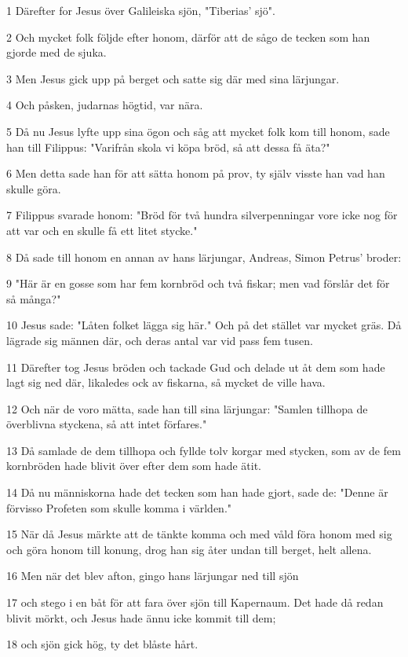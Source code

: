 \par 1 Därefter for Jesus över Galileiska sjön, "Tiberias' sjö".
\par 2 Och mycket folk följde efter honom, därför att de sågo de tecken som han gjorde med de sjuka.
\par 3 Men Jesus gick upp på berget och satte sig där med sina lärjungar.
\par 4 Och påsken, judarnas högtid, var nära.
\par 5 Då nu Jesus lyfte upp sina ögon och såg att mycket folk kom till honom, sade han till Filippus: "Varifrån skola vi köpa bröd, så att dessa få äta?"
\par 6 Men detta sade han för att sätta honom på prov, ty själv visste han vad han skulle göra.
\par 7 Filippus svarade honom: "Bröd för två hundra silverpenningar vore icke nog för att var och en skulle få ett litet stycke."
\par 8 Då sade till honom en annan av hans lärjungar, Andreas, Simon Petrus' broder:
\par 9 "Här är en gosse som har fem kornbröd och två fiskar; men vad förslår det för så många?"
\par 10 Jesus sade: "Låten folket lägga sig här." Och på det stället var mycket gräs. Då lägrade sig männen där, och deras antal var vid pass fem tusen.
\par 11 Därefter tog Jesus bröden och tackade Gud och delade ut åt dem som hade lagt sig ned där, likaledes ock av fiskarna, så mycket de ville hava.
\par 12 Och när de voro mätta, sade han till sina lärjungar: "Samlen tillhopa de överblivna styckena, så att intet förfares."
\par 13 Då samlade de dem tillhopa och fyllde tolv korgar med stycken, som av de fem kornbröden hade blivit över efter dem som hade ätit.
\par 14 Då nu människorna hade det tecken som han hade gjort, sade de: "Denne är förvisso Profeten som skulle komma i världen."
\par 15 När då Jesus märkte att de tänkte komma och med våld föra honom med sig och göra honom till konung, drog han sig åter undan till berget, helt allena.
\par 16 Men när det blev afton, gingo hans lärjungar ned till sjön
\par 17 och stego i en båt för att fara över sjön till Kapernaum. Det hade då redan blivit mörkt, och Jesus hade ännu icke kommit till dem;
\par 18 och sjön gick hög, ty det blåste hårt.
